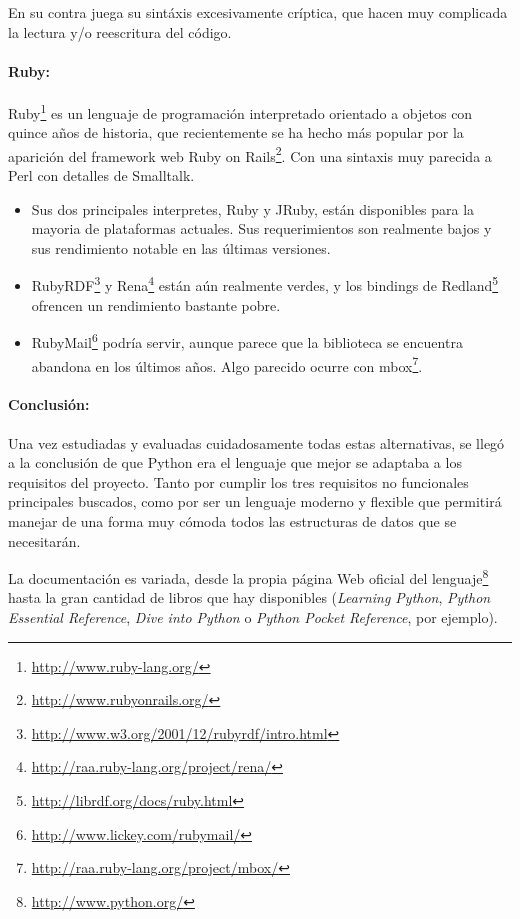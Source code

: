 En su contra juega su sintáxis excesivamente críptica, que hacen muy complicada
la lectura y/o reescritura del código.

\paragraph{Ruby:}Ruby\footnote{\url{http://www.ruby-lang.org/}} es un lenguaje de 
programación interpretado orientado a objetos con quince años de historia, que 
recientemente se ha hecho más popular por la aparición del framework web 
Ruby on Rails\footnote{\url{http://www.rubyonrails.org/}}. Con una sintaxis muy
parecida a Perl con detalles de Smalltalk.

\begin{itemize}
  \item Sus dos principales interpretes, Ruby y JRuby, están disponibles para la
	mayoria de plataformas actuales. Sus requerimientos son realmente bajos y
	sus rendimiento notable en las últimas versiones.
  \item RubyRDF\footnote{\url{http://www.w3.org/2001/12/rubyrdf/intro.html}} y 
	Rena\footnote{\url{http://raa.ruby-lang.org/project/rena/}} están aún
	realmente verdes, y los bindings de Redland\footnote{\url{http://librdf.org/docs/ruby.html}} 
	ofrencen un rendimiento bastante pobre.
  \item RubyMail\footnote{\url{http://www.lickey.com/rubymail/}} podría servir,
	aunque parece que la biblioteca se encuentra abandona en los últimos años. 
	Algo parecido ocurre con mbox\footnote{\url{http://raa.ruby-lang.org/project/mbox/}}.
\end{itemize}

\paragraph{Conclusión:}Una vez estudiadas y evaluadas cuidadosamente todas estas 
alternativas, se llegó a la conclusión de que Python era el lenguaje que mejor se 
adaptaba a los requisitos del proyecto. Tanto por cumplir los tres requisitos 
no funcionales principales buscados, como por ser un lenguaje moderno y flexible 
que permitirá manejar de una forma muy cómoda todos las estructuras de datos que se
necesitarán.

La documentación es variada, desde la propia página Web oficial del 
lenguaje\footnote{\url{http://www.python.org/}} hasta la gran cantidad de libros
que hay disponibles (\emph{Learning Python}\cite{LearningPython},
\emph{Python Essential Reference}\cite{PythonEssential}, 
\emph{Dive into Python}\cite{DivePython} o \emph{Python Pocket Reference}\cite{PythonPocket},
por ejemplo).

